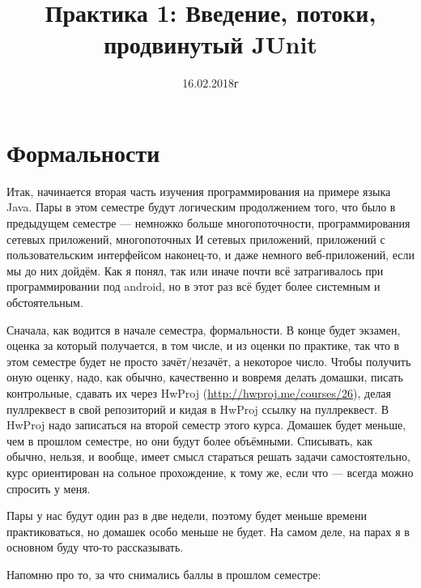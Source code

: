 \documentclass[a5paper]{article}
\title{Практика 1: Введение, потоки, продвинутый JUnit}
\date{16.02.2018г}
\begin{document}
\maketitle
\thispagestyle{empty}

\section{Формальности}
Итак, начинается вторая часть изучения программирования на примере языка Java. Пары в этом семестре будут логическим продолжением того, что было в предыдущем семестре --- немножко больше многопоточности, программирования сетевых приложений, многопоточных И сетевых приложений, приложений с пользовательским интерфейсом наконец-то, и даже немного веб-приложений, если мы до них дойдём. Как я понял, так или иначе почти всё затрагивалось при программировании под android, но в этот раз всё будет более системным и обстоятельным.

Сначала, как водится в начале семестра, формальности. В конце будет экзамен, оценка за который получается, в том числе, и из оценки по практике, так что в этом семестре будет не просто зачёт/незачёт, а некоторое число. Чтобы получить оную оценку, надо, как обычно, качественно и вовремя делать домашки, писать контрольные, сдавать их через HwProj (\url{http://hwproj.me/courses/26}), делая пуллреквест в свой репозиторий и кидая в HwProj ссылку на пуллреквест. В HwProj надо записаться на второй семестр этого курса. Домашек будет меньше, чем в прошлом семестре, но они будут более объёмными. Списывать, как обычно, нельзя, и вообще, имеет смысл стараться решать задачи самостоятельно, курс ориентирован на сольное прохождение, к тому же, если что --- всегда можно спросить у меня.

Пары у нас будут один раз в две недели, поэтому будет меньше времени практиковаться, но домашек особо меньше не будет. На самом деле, на парах я в основном буду что-то рассказывать.

Напомню про то, за что снимались баллы в прошлом семестре:\nopagebreak
\end{document}
